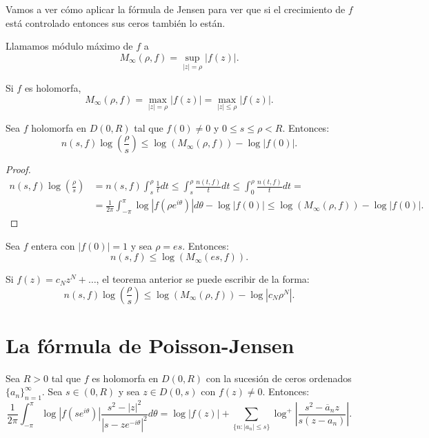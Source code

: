 Vamos a ver cómo aplicar la fórmula de Jensen para ver que si el crecimiento de $f$ está controlado entonces sus ceros también lo están.

\begin{definition}
    Llamamos módulo máximo de $f$ a
    $$M_\infty(\rho, f) = \sup_{|z|=\rho} |f(z)|.$$
\end{definition}

\begin{remark}
    Si $f$ es holomorfa,
    $$M_\infty(\rho, f) = \max_{|z|=\rho} |f(z)| = \max_{|z|\leq\rho} |f(z)|.$$
\end{remark}

\begin{theorem}
    Sea $f$ holomorfa en $D(0, R)$ tal que $f(0) \neq 0$ y $0 \leq s \leq \rho < R$.
    Entonces:
    $$n(s, f)\log\left(\frac{\rho}{s}\right) \leq \log(M_\infty(\rho, f)) - \log|f(0)|.$$
\end{theorem}

\begin{proof}
    \begin{align*}
        n(s, f)\log\left(\frac{\rho}{s}\right) & = n(s, f)\int_s^\rho \frac{1}{t}dt \leq \int_s^\rho \frac{n(t, f)}{t}dt \leq \int_0^\rho \frac{n(t, f)}{t}dt =            \\
                                               & = \frac{1}{2\pi} \int_{-\pi}^\pi \log|f(\rho e^{i\theta})|d\theta - \log|f(0)| \leq \log(M_\infty(\rho, f)) - \log|f(0)|.
    \end{align*}
\end{proof}

\begin{example}
    Sea $f$ entera con $|f(0)| = 1$ y sea $\rho = es$.
    Entonces:
    $$n(s, f) \leq \log(M_\infty(es, f)).$$
\end{example}

\begin{remark}
    Si $f(z) = c_Nz^N + \dots$, el teorema anterior se puede escribir de la forma:
    $$n(s, f)\log\left(\frac{\rho}{s}\right) \leq \log(M_\infty(\rho, f)) - \log|c_N\rho^N|.$$
\end{remark}

\section{La fórmula de Poisson-Jensen}
\begin{theorem}
    Sea $R > 0$ tal que $f$ es holomorfa en $D(0, R)$ con la sucesión de ceros ordenados $\{a_n\}_{n=1}^\infty$.
    Sea $s \in (0, R)$ y sea $z \in D(0, s)$ con $f(z) \neq 0$.
    Entonces:
    $$\frac{1}{2\pi} \int_{-\pi}^\pi \log|f(se^{i\theta})|\frac{s^2-|z|^2}{|s-ze^{-i\theta}|^2}d\theta = \log|f(z)| + \sum_{\{n : |a_n| \leq s\}} \log^+\left|\frac{s^2-\overline{a}_nz}{s(z-a_n)}\right|.$$
\end{theorem}

